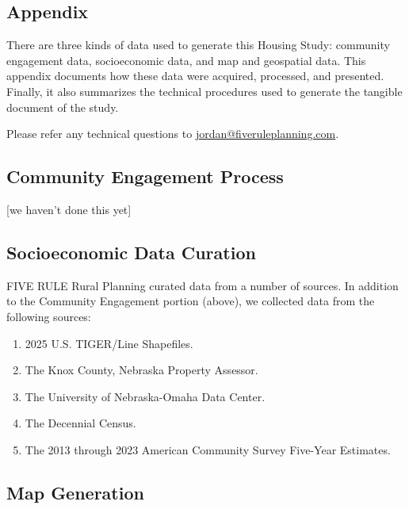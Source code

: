 \documentclass[
  letterpaper,
  DIV=11,
  numbers=noendperiod]{scrartcl}
\providecommand{\tightlist}{%
  \setlength{\itemsep}{0pt}\setlength{\parskip}{0pt}}
\begin{document}
\subsection*{Appendix}\label{appendix}

There are three kinds of data used to generate this Housing Study:
community engagement data, socioeconomic data, and map and geospatial
data. This appendix documents how these data were acquired, processed,
and presented. Finally, it also summarizes the technical procedures used
to generate the tangible document of the study.

Please refer any technical questions to
\url{jordan@fiveruleplanning.com}.

\subsection*{Community Engagement
Process}\label{community-engagement-process}

{[}we haven't done this yet{]}

\subsection*{Socioeconomic Data
Curation}\label{socioeconomic-data-curation}

FIVE RULE Rural Planning curated data from a number of sources. In
addition to the Community Engagement portion (above), we collected data
from the following sources:

\begin{enumerate}
\def\labelenumi{\arabic{enumi}.}
\tightlist
\item
  2025 U.S. TIGER/Line Shapefiles.
\item
  The Knox County, Nebraska Property Assessor.
\item
  The University of Nebraska-Omaha Data Center.
\item
  The Decennial Census.
\item
  The 2013 through 2023 American Community Survey Five-Year Estimates.
\end{enumerate}

\subsection*{Map Generation}\label{map-generation}
\end{document}

